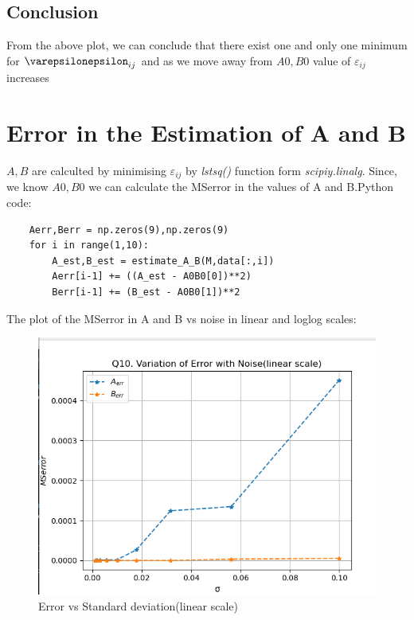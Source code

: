 \documentclass[11pt, a4paper]{article}
\begin{document}
\subsection{Conclusion}
From the above plot, we can conclude that there exist one and only one minimum for $\varepsilonepsilon_{ij}$ and as we move away from $A0,B0$ value of $\varepsilon_{ij}$ increases

\section{Error in the Estimation of A and B} 
$A,B$ are calculted by minimising $\varepsilon_{ij}$ by \textit{lstsq()} function form \textit{scipiy.linalg}. Since, we know $A0,B0$ we can calculate the MSerror in the values of A and B.Python code:
\begin{verbatim}	
    Aerr,Berr = np.zeros(9),np.zeros(9)
    for i in range(1,10):
        A_est,B_est = estimate_A_B(M,data[:,i])
        Aerr[i-1] += ((A_est - A0B0[0])**2)
        Berr[i-1] += (B_est - A0B0[1])**2
\end{verbatim}

The plot of the MSerror in A and B vs noise in linear and loglog scales:
\begin{figure}[!h]
   	\centering
   	\includegraphics[scale=0.6]{Err with noise(linear).png}   
   	\caption{Error vs Standard deviation(linear scale)}
   	\label{fig:Figure 5}
\end{figure} 
\end{document}
